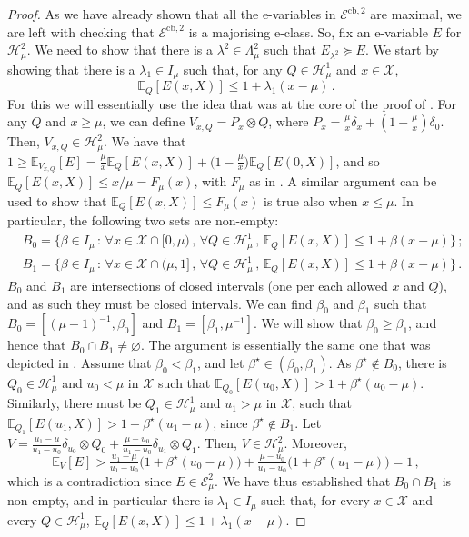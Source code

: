 \documentclass[3p, authoryear, 10pt]{elsarticle}%
\newcommand{\E}{\mathbb E}
\newcommand{\Ee}{\mathcal E}
\newcommand{\Hh}{\mathcal H}
\newcommand{\X}{\mathcal X}
\begin{document}
\begin{proof}
    As we have already shown that all the e-variables in $\mathcal E^{\mathrm{cb},2}$ are maximal, we are left with checking that $\mathcal E^{\mathrm{cb},2}$ is a majorising e-class. So, fix an e-variable $E$ for $\Hh_\mu^2$. We need to show that there is a $\lambda^2\in\Lambda^2_\mu$ such that $E_{\lambda^2}\succeq E$. We start by showing that there is a $\lambda_1\in I_\mu$ such that, for any $Q\in\Hh^1_\mu$ and $x\in\X$, $$\E_Q[E(x, X)]\leq 1+\lambda_1(x-\mu)\,.$$ For this we will essentially use the idea that was at the core of the proof of . For any $Q$ and $x\geq\mu$, we can define $V_{x,Q} = P_x\otimes Q$, where $P_x = \frac{\mu}{x}\delta_{x} + (1-\frac{\mu}{x})\delta_0$. Then, $V_{x,Q}\in\Hh_{\mu}^2$. We have that $1\geq \E_{V_{x,Q}}[E]= \tfrac{\mu}{x}\E_Q[E(x, X)]+ \big(1-\tfrac{\mu}{x}\big)\E_Q[E(0, X)]$, and so $\E_Q[E(x, X)]\leq x/\mu = F_\mu(x)$,  with $F_\mu$  as in . A similar argument can be used to show that $\E_Q[E(x, X)]\leq F_\mu(x)$ is true also when $x\leq\mu$. In particular, the following two sets are non-empty:
    \begin{align*}
        &B_0 = \big\{\beta\in I_\mu\,:\,\forall x\in\X\cap[0,\mu)\,,\,\forall Q\in\Hh_\mu^{1}\,,\,\E_Q[E(x,X)]\leq 1+\beta (x-\mu)\big\}\,;\\
        &B_1 = \big\{\beta\in I_\mu\,:\,\forall x\in\X\cap(\mu,1]\,,\,\forall Q\in\Hh_\mu^{1}\,,\,\E_Q[E(x,X)]\leq 1+\beta (x-\mu)\big\}\,.
    \end{align*} 
    $B_0$ and $B_1$ are intersections of closed intervals (one per each allowed $x$ and $Q$), and as such they must be closed intervals. We can find $\beta_0$ and $\beta_1$ such that 
    $B_0 = [(\mu-1)^{-1},\beta_0]$ and $B_1 = [\beta_1, \mu^{-1}]$. We will show that $\beta_0\geq\beta_1$, and hence that $B_0\cap B_1\neq\varnothing$. The argument is essentially the same one that was depicted in . Assume that $\beta_0<\beta_1$, and let $\beta^\star\in(\beta_0,\beta_1)$. As $\beta^\star\notin B_0$, there is $Q_0\in\Hh^{1}_\mu$ and $u_0<\mu$ in $\X$ such that $\E_{Q_0}[E(u_0, X)]> 1+\beta^\star (u_0-\mu)$. Similarly, there must be $Q_1\in\Hh_\mu^{1}$ and $u_1>\mu$ in $\X$, such that $\E_{Q_1}[E(u_1, X)]> 1 + \beta^\star (u_1-\mu)$, since $\beta^\star\notin B_1$. Let $V = \frac{u_1-\mu}{u_1-u_0}\delta_{u_0}\otimes Q_0 + \frac{\mu-u_0}{u_1-u_0}\delta_{u_1}\otimes Q_1$. Then, $ V\in\Hh^2_\mu$. Moreover,
    $$\E_{V}[E] >\tfrac{u_1-\mu}{u_1-u_0}\big(1+\beta^\star (u_0-\mu)\big) + \tfrac{\mu-u_0}{u_1-u_0}\big(1+\beta^\star (u_1-\mu)\big)=1\,,$$ which is a contradiction since $E\in\Ee^2_\mu$. We have thus established that $B_0\cap B_1$ is non-empty, and in particular there is $\lambda_1\in I_\mu$ such that, for every $x\in\X$ and every $Q\in\Hh_\mu^{1}$, $\E_Q[E(x, X)]\leq 1 + \lambda_1 (x-\mu)$.
 

\end{proof}
\end{document}
